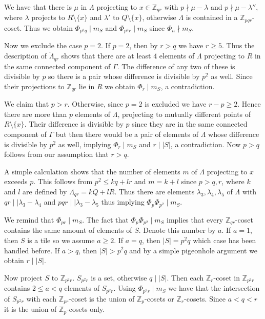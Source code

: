 \documentclass[10pt]{article}
\newcommand{\Z}{\mathbb{Z}}
\newcommand{\La}{\Lambda}
\newcommand{\la}{\lambda}
\begin{document}
        We have that there is $\mu$ in $\La$ projecting to $x \in \Z_{qr}$ with $p \nmid \mu-\la$ and $p \nmid \mu-\la''$, where $\la$ projects to $R \setminus\{x\}$ and $\la'$ to $Q \setminus\{x\}$, otherwise $\La$ is contained in a $\Z_{pqr}$-coset. 
        Thus we obtain $\Phi_{p^2q} \mid m_S$ and $\Phi_{p^2r} \mid m_S$ since $\Phi_n \nmid m_S$.
        
        Now we exclude the case $p=2$. If $p=2$, then by $r>q$ we have $r \ge 5$. Thus the description of $\tilde{\La}_{qr}$ shows that there are at least $4$ elements of $\La$ projecting to $R$ in the same connected component of $\Gamma$. The difference of any two of these is divisible by $p$ so there is a pair whose difference is divisible by $p^2$ as well. Since their projections to $\Z_{qr}$ lie in $R$ we obtain $\Phi_r \mid m_S$, a contradiction. 
        
        We claim that $p>r$. Otherwise, since $p=2$ is excluded we have $r-p \ge 2$. Hence there are more than $p$ elements of $\La$, projecting to mutually different points of $R \setminus \{x\}$. Their difference is divisible by $p$ since they are in the same connected component of $\Gamma$ but then there would be a pair of elements of $\Lambda$ whose difference is divisible by $p^2$ as well, implying $\Phi_r \mid m_S$ and $r \mid |S| $, a contradiction. 
        Now $p>q$ follows from our assumption that $r > q$.
        
        
        A simple calculation shows that the number of elements $m$ of $\La$ projecting to $x$ exceeds $p$. This follows from $p^2 \le kq+lr$ and $m=k+l$ since $p>q,r$, where $k$ and $l$ are defined by $\La_{qr}=kQ+lR$. Thus there are elements $\la_3,\la_4,\la_5$ of $\La$ with $qr \mid \mid \la_3-\la_4$ and $pqr \mid \mid \la_3-\la_5$ thus implying $\Phi_p \Phi_{p^2} \mid m_S$.
        
        
        We remind that $\Phi_{pr} \mid m_S$.
        The fact that $\Phi_p \Phi_{p^2} \mid m_S$ implies that every $\Z_{qr}$-coset contains the same amount of elements of $S$. Denote this number by $a$. If $a=1$, then $S$ is a tile so we assume $a \ge 2$. 
        If $a=q$, then $|S|=p^2q$ which case has been handled before. If $a>q$, then $|S|>p^2q$ and by a simple pigeonhole argument  we obtain $r \mid |S|$.
        
        Now project $S$ to $\Z_{p^2r}$. $S_{p^2r}$ is a set, otherwise $q \mid |S|$.
        Then each $\Z_r$-coset in $\Z_{p^2r}$ contains $2 \le a < q$  elements of $S_{p^2r}$. 
        Using $\Phi_{p^2r} \mid m_S$ 
        we have that the intersection of $S_{p^2r}$ with each $\Z_{pr}$-coset is the union of $\Z_p$-cosets or $\Z_r$-cosets. Since $a<q<r$ 
        it is the union of $\Z_p$-cosets only. 
        
\end{document}
